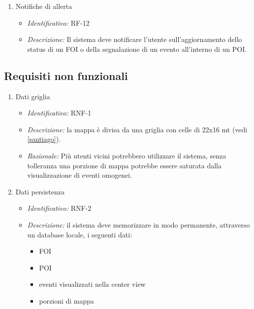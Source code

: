 \begin{enumerate}
   \item Notifiche di allerta
  \begin{itemize}
  \item\textit{Identificativo:} RF-12
  \item\textit{Descrizione:} Il sistema deve notificare l’utente sull’aggiornamento dello status di un FOI o della segnalazione di un evento all’interno di un POI.
  \end{itemize}
  
\end{enumerate}

 \subsection{Requisiti non funzionali}
 
\begin{enumerate}
   \item Dati griglia
  \begin{itemize}
  \item\textit{Identificativo:} RNF-1
  \item\textit{Descrizione:} la mappa è divisa da una griglia con celle di 22x16 mt (vedi \ref{santiago}).
   \item\textit{Razionale:} Più utenti vicini potrebbero utilizzare il sistema, senza tolleranza una porzione di mappa potrebbe essere saturata dalla  visualizzazione di eventi omogenei.
  \end{itemize}
  
  \item Dati persistenza
  \begin{itemize}
  \item\textit{Identificativo:} RNF-2
  \item\textit{Descrizione:} il sistema deve memorizzare in modo permanente, attraverso un database locale, i seguenti dati:
	\begin{itemize}
	\item FOI
	\item POI
	\item eventi visualizzati nella center view
	\item porzioni di mappa
	\end{itemize}
  \end{itemize}
  

\end{enumerate}
